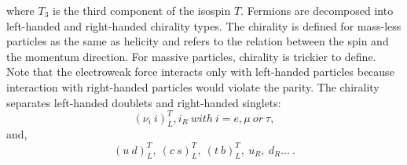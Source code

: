 where $T_3$ is the third component of the isospin $T$.
Fermions are decomposed into left-handed and right-handed chirality types. The chirality is defined for mass-less particles as the same as helicity and refers to the relation between the spin and the momentum direction. For massive particles, chirality is trickier to define. Note that the electroweak force interacts only with left-handed particles because interaction with right-handed particles would violate the parity. The chirality separates left-handed doublets and right-handed singlets:
\begin{equation}
    (\nu_i \ i)^T_L, i_R \ with \ i = e, \mu \ or \ \tau,
\end{equation}
and, 
\begin{equation}
    (u \ d)^T_L, \ (c \ s)^T_L, \ (t \ b)^T_L, \ u_R, \ d_R ... \ . 
\end{equation}

